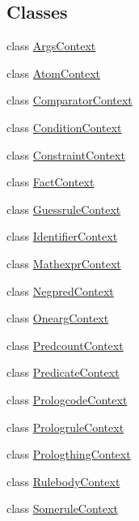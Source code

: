 \subsection*{Classes}
\begin{DoxyCompactItemize}
\item 
class \hyperlink{class_prolog_rules_parser_1_1_prolog_rules_parser_1_1_args_context}{Args\+Context}
\item 
class \hyperlink{class_prolog_rules_parser_1_1_prolog_rules_parser_1_1_atom_context}{Atom\+Context}
\item 
class \hyperlink{class_prolog_rules_parser_1_1_prolog_rules_parser_1_1_comparator_context}{Comparator\+Context}
\item 
class \hyperlink{class_prolog_rules_parser_1_1_prolog_rules_parser_1_1_condition_context}{Condition\+Context}
\item 
class \hyperlink{class_prolog_rules_parser_1_1_prolog_rules_parser_1_1_constraint_context}{Constraint\+Context}
\item 
class \hyperlink{class_prolog_rules_parser_1_1_prolog_rules_parser_1_1_fact_context}{Fact\+Context}
\item 
class \hyperlink{class_prolog_rules_parser_1_1_prolog_rules_parser_1_1_guessrule_context}{Guessrule\+Context}
\item 
class \hyperlink{class_prolog_rules_parser_1_1_prolog_rules_parser_1_1_identifier_context}{Identifier\+Context}
\item 
class \hyperlink{class_prolog_rules_parser_1_1_prolog_rules_parser_1_1_mathexpr_context}{Mathexpr\+Context}
\item 
class \hyperlink{class_prolog_rules_parser_1_1_prolog_rules_parser_1_1_negpred_context}{Negpred\+Context}
\item 
class \hyperlink{class_prolog_rules_parser_1_1_prolog_rules_parser_1_1_onearg_context}{Onearg\+Context}
\item 
class \hyperlink{class_prolog_rules_parser_1_1_prolog_rules_parser_1_1_predcount_context}{Predcount\+Context}
\item 
class \hyperlink{class_prolog_rules_parser_1_1_prolog_rules_parser_1_1_predicate_context}{Predicate\+Context}
\item 
class \hyperlink{class_prolog_rules_parser_1_1_prolog_rules_parser_1_1_prologcode_context}{Prologcode\+Context}
\item 
class \hyperlink{class_prolog_rules_parser_1_1_prolog_rules_parser_1_1_prologrule_context}{Prologrule\+Context}
\item 
class \hyperlink{class_prolog_rules_parser_1_1_prolog_rules_parser_1_1_prologthing_context}{Prologthing\+Context}
\item 
class \hyperlink{class_prolog_rules_parser_1_1_prolog_rules_parser_1_1_rulebody_context}{Rulebody\+Context}
\item 
class \hyperlink{class_prolog_rules_parser_1_1_prolog_rules_parser_1_1_somerule_context}{Somerule\+Context}
\end{DoxyCompactItemize}
